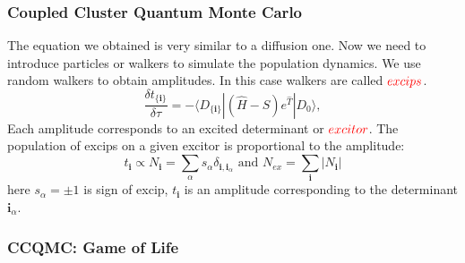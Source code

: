 \documentclass{beamer}
\begin{document}
\begin{frame}
\frametitle{Coupled Cluster Quantum Monte Carlo}
The equation we obtained is very similar to a diffusion one. Now we need to introduce particles or walkers to simulate the population dynamics. We use random walkers to obtain amplitudes. In this case walkers are called ${\color{red}excips}$. 
\begin{equation*}	
\frac{\delta t_{\{\boldsymbol{i}\}}}{\delta\tau} = -\langle D_{\{\boldsymbol{i}\}}|(\hat{H}-S)e^{\hat{T}}|D_0\rangle,
\end{equation*}
Each amplitude corresponds to an excited determinant or ${\color{red}excitor}$. The population of excips on a given excitor is proportional to the amplitude:
\begin{equation*}	
t_{\boldsymbol{i}} \propto N_{\boldsymbol{i}} = \sum_\alpha s_\alpha \delta_{{\boldsymbol{i}}, {\boldsymbol{i}}_\alpha} \text{ and }  N_{ex} = \sum_{\boldsymbol{i}} |N_{\boldsymbol{i}}|
\end{equation*}
here $s_\alpha = \pm 1$ is sign of excip, $t_{\boldsymbol{i}}$ is an amplitude corresponding to the determinant ${{\boldsymbol{i}}_\alpha}$. %
\end{frame}



\begin{frame}
\frametitle{CCQMC: Game of Life}
\end{frame}
\end{document}
